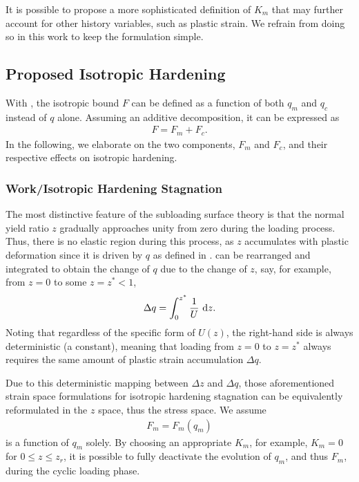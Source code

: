 It is possible to propose a more sophisticated definition of $K_m$ that may further account for other history variables, such as plastic strain.
We refrain from doing so in this work to keep the formulation simple.
\subsection{Proposed Isotropic Hardening}
With , the isotropic bound $F$ can be defined as a function of both $q_m$ and $q_c$ instead of $q$ alone.
Assuming an additive decomposition, it can be expressed as
\begin{gather}\label{eq:f_revised}
    F=F_m+F_c.
\end{gather}
In the following, we elaborate on the two components, $F_m$ and $F_c$, and their respective effects on isotropic hardening.
\subsubsection{Work/Isotropic Hardening Stagnation}
The most distinctive feature of the subloading surface theory is that the normal yield ratio $z$ gradually approaches unity from zero during the loading process.
Thus, there is no elastic region during this process, as $z$ accumulates with plastic deformation since it is driven by $q$ as defined in .
 can be rearranged and integrated to obtain the change of $q$ due to the change of $z$, say, for example, from $z=0$ to some $z=z^*<1$,
\begin{gather}\label{eq:int_z}
    \Delta{}q=\int_{0}^{z^*}\dfrac{1}{U}~\mathrm{d}z.
\end{gather}
Noting that regardless of the specific form of $U\left(z\right)$, the right-hand side is always deterministic (a constant), meaning that loading from $z=0$ to $z=z^*$ always requires the same amount of plastic strain accumulation $\Delta{}q$.

Due to this deterministic mapping between $\Delta{}z$ and $\Delta{}q$, those aforementioned strain space formulations for isotropic hardening stagnation can be equivalently reformulated in the $z$ space, thus the stress space.
We assume
\begin{gather}\label{eq:isotropic_stagnation}
    F_m=F_m\left(q_m\right)
\end{gather}
is a function of $q_m$ solely.
By choosing an appropriate $K_m$, for example, $K_m=0$ for $0\leqslant{}z\leqslant{}z_r$, it is possible to fully deactivate the evolution of $q_m$, and thus $F_m$, during the cyclic loading phase.

